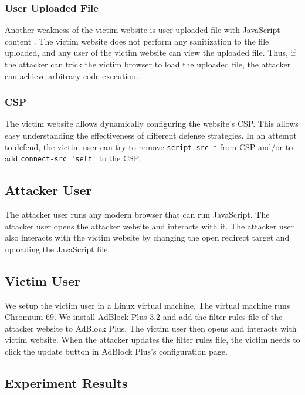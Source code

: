 \documentclass[conference]{IEEEtran}
\begin{document}
\subsubsection{User Uploaded File}

Another weakness of the victim website is user uploaded file with JavaScript content \cite{cwe_upload_file}. The victim website does not perform any sanitization to the file uploaded, and any user of the victim website can view the uploaded file. Thus, if the attacker can trick the victim browser to load the uploaded file, the attacker can achieve arbitrary code execution.

\subsubsection{CSP}

The victim website allows dynamically configuring the website's CSP. This allows easy understanding the effectiveness of different defense strategies. In an attempt to defend, the victim user can try to remove \lstinline{script-src *} from CSP and/or to add \lstinline{connect-src 'self'} to the CSP.

\subsection{Attacker User}

The attacker user runs any modern browser that can run JavaScript. The attacker user opens the attacker website and interacts with it. The attacker user also interacts with the victim website by changing the open redirect target and uploading the JavaScript file.

\subsection{Victim User}

We setup the victim user in a Linux virtual machine. The virtual machine runs Chromium 69. We install AdBlock Plus 3.2 and add the filter rules file of the attacker website to AdBlock Plus. The victim user then opens and interacts with victim website. When the attacker updates the filter rules file, the victim needs to click the update button in AdBlock Plus's configuration page.

\subsection{Experiment Results}
\end{document}

